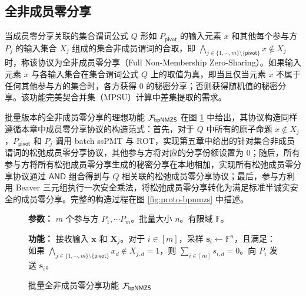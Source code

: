 \subsection{全非成员零分享}

当成员零分享关联的集合谓词公式 $Q$ 形如 $P_\mathsf{pivot}$ 的输入元素 $x$ 和其他每个参与方 $P_j$ 的输入集合 $X_j$ 组成的集合非成员谓词的合取，即 $\bigwedge_{j \in \{1,\cdots,m\} \setminus \{\mathsf{pivot}\}} x \notin X_j$ 时，称该协议为全非成员零分享（Full Non-Membership Zero-Sharing）。如果输入元素 $x$ 与各输入集合在集合谓词公式 $Q$ 上的取值为真，即当且仅当元素 $x$ 不属于任何其他参与方的集合时，各方获得 $0$ 的秘密分享；否则获得随机值的秘密分享。该功能完美契合并集（MPSU）计算中差集提取的需求。

批量版本的全非成员零分享的理想功能 $\mathcal{F}_\mathsf{bpNMZS}$ 在图 \ref{fig:func-bpnmzs} 中给出，其协议构造同样遵循本章中成员零分享协议的构造范式：首先，对于 $Q$ 中所有的原子命题 $x \notin X_j$，$P_\mathsf{pivot}$ 和 $P_j$ 调用 batch ssPMT 与 ROT，实现第五章中给出的针对集合非成员谓词的松弛成员零分享协议，其他参与方将对应的分享份额设置为 $0$；随后，所有参与方将所有松弛成员零分享生成的秘密分享在本地相加，实现所有松弛成员零分享协议通过 $\mathsf{AND}$ 组合得到与 $Q$ 相关联的松弛成员零分享协议；最后，参与方利用 Beaver 三元组执行一次安全乘法，将松弛成员零分享转化为满足标准半诚实安全的成员零分享。完整的构造过程在图 \ref{fig:proto-bpnmzs} 中描述。

\begin{figure}[!htb]
\begin{framed}
\begin{minipage}[c]{\textwidth}
\begin{trivlist}
\item \textbf{参数：} $m$ 个参与方 $P_1, \cdots P_m$。批量大小 $n$。有限域 $\mathbb{F}$。 
\item \textbf{功能：} 接收输入 $\textbf{x}$ 和 $\textbf{X}_j$。对于 $i \in [m]$，采样 $\textbf{s}_i \gets \mathbb{F}^n$，且满足：如果 $\bigwedge_{j \in \{1,\cdots,m\} \setminus \{\mathsf{pivot}\}} x_d \notin X_{j,d} = 1$，则 $\sum_{i \in [m]} s_{i,d} = 0$。向 $P_i$ 发送 $\textbf{s}_i$。
\end{trivlist}
\end{minipage}
\end{framed}
\caption{批量全非成员零分享功能 $\mathcal{F}_\mathsf{bpNMZS}$}\label{fig:func-bpnmzs}
\end{figure}

